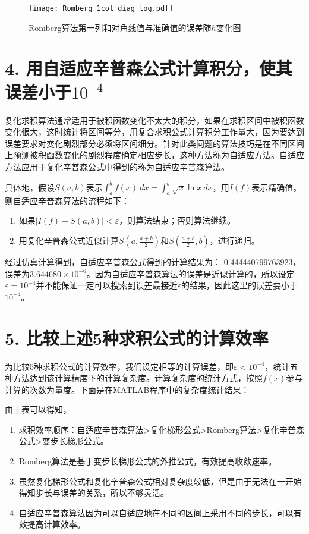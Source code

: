 \begin{figure}[t]
    \centering
    \texttt{[image: Romberg\_1col\_diag\_log.pdf]} \\
    \caption{Romberg算法第一列和对角线值与准确值的误差随$h$变化图}
    \label{fig:Romberg_T}
\end{figure}

\section*{4. 用自适应辛普森公式计算积分，使其误差小于$10^{-4}$}

复化求积算法通常适用于被积函数变化不太大的积分，如果在求积区间中被积函数变化很大，这时统计将区间等分，用复合求积公式计算积分工作量大，因为要达到误差要求对变化剧烈部分必须将区间细分。针对此类问题的算法技巧是在不同区间上预测被积函数变化的剧烈程度确定相应步长，这种方法称为自适应方法。自适应方法应用于复化辛普森公式中得到的称为自适应辛普森算法。

具体地，假设$S(a,b)$表示$\int_{a}^{b} f(x) \ dx = \int_{a}^{b} \sqrt{x} \ln x  \ dx$，用$I(f)$表示精确值。则自适应辛普森算法的流程如下：
\begin{enumerate}
    \item 如果$|I(f) - S(a,b) | < \varepsilon$，则算法结束；否则算法继续。
    \item 用复化辛普森公式近似计算$S(a, \frac{a+b}{2})$和$S(\frac{a+b}{2}, b)$，进行递归。
\end{enumerate}

经过仿真计算得到，自适应辛普森公式得到的计算结果为：-0.444440799763923，误差为$3.644680\times 10^{-6}$。因为自适应辛普森算法的误差是近似计算的，所以设定$\varepsilon = 10^{-4}$并不能保证一定可以搜索到误差最接近$\varepsilon$的结果，因此这里的误差要小于$10^{-4}$。

\section*{5. 比较上述5种求积公式的计算效率}

为比较5种求积公式的计算效率，我们设定相等的计算误差，即$\varepsilon < 10^{-4}$，统计五种方法达到该计算精度下的计算复杂度。计算复杂度的统计方式，按照$f(x)$参与计算的次数为量度。下面是在MATLAB程序中的复杂度统计结果：
\begin{table}[!hpt]
    \caption{5种求积公式计算复杂度统计表}
    \label{tab:Complexity}
    \centering
\end{table}

由上表可以得知，
\begin{enumerate}
    \item 求积效率顺序：自适应辛普森算法>复化梯形公式>Romberg算法>复化辛普森公式>变步长梯形公式。
    \item Romberg算法是基于变步长梯形公式的外推公式，有效提高收敛速率。
    \item 虽然复化梯形公式和复化辛普森公式相对复杂度较低，但是由于无法在一开始得知步长与误差的关系，所以不够灵活。
    \item 自适应辛普森算法因为可以自适应地在不同的区间上采用不同的步长，可以有效提高计算效率。
\end{enumerate}


